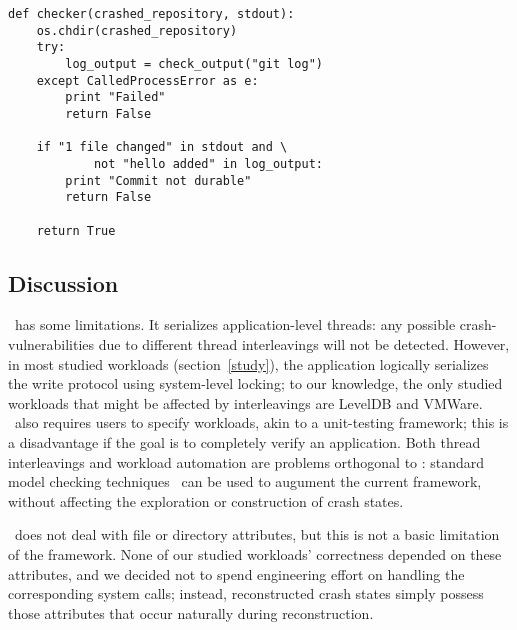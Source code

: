 \begin{lstlisting}[float=t, caption = {\textbf{Checker. } {\footnotesize{\it If the application behaves correctly, True is returned. Otherwise, the reason for failure is printed out, and False is returned.}}}, label = {six}, escapechar=!]
def checker(crashed_repository, stdout):
    os.chdir(crashed_repository)
    try:
        log_output = check_output("git log")
    except CalledProcessError as e:
        print "Failed"
        return False

    if "1 file changed" in stdout and \
            not "hello added" in log_output:
        print "Commit not durable"
        return False

    return True
\end{lstlisting}

\subsection{Discussion} \label{discussion} \Kassandra\ has some limitations.
It serializes application-level threads: any possible crash-vulnerabilities
due to different thread interleavings will not be detected. However, in most
studied workloads (section~\ref{study}), the application logically serializes
the write protocol using system-level locking; to our knowledge, the only
studied workloads that might be affected by interleavings are LevelDB and
VMWare. \Kassandra\ also requires users to specify workloads, akin to a
unit-testing framework; this is a disadvantage if the goal is to completely
verify an application. Both thread interleavings and workload automation are
problems orthogonal to \Kassandra: standard model checking
techniques~\cite{verisoft} can be used to augument the current framework,
without affecting the exploration or construction of crash states.

\Kassandra\ does not deal with file or directory attributes, but this is not a
basic limitation of the framework. None of our studied workloads' correctness
depended on these attributes, and we decided not to spend engineering effort
on handling the corresponding system calls; instead, reconstructed crash
states simply possess those attributes that occur naturally during
reconstruction.

